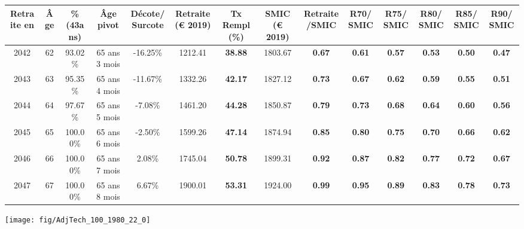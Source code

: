 \begin{adjustbox}{max width=\textwidth} 
\begin{tabular}[htb]{|c|c||c|c|c||c|c||c|c||c|c|c|c|c|} 
\hline 
 Retraite en &  Âge &  \%(43ans) &  Âge pivot &  Décote/Surcote &  Retraite (\euro{} 2019) &  Tx Rempl(\%) &  SMIC (\euro{} 2019) &  Retraite/SMIC &  R70/SMIC &  R75/SMIC &  R80/SMIC &  R85/SMIC &  R90/SMIC \\ 
\hline \hline 
 2042 &  62 &  93.02\% &  65 ans 3 mois &  -16.25\% &  1212.41 &  {\bf 38.88} &  1803.67 &  {\bf {\color{red} 0.67}} &  {\bf {\color{red} 0.61}} &  {\bf {\color{red} 0.57}} &  {\bf {\color{red} 0.53}} &  {\bf {\color{red} 0.50}} &  {\bf {\color{red} 0.47}} \\ 
\hline 
 2043 &  63 &  95.35\% &  65 ans 4 mois &  -11.67\% &  1332.26 &  {\bf 42.17} &  1827.12 &  {\bf {\color{red} 0.73}} &  {\bf {\color{red} 0.67}} &  {\bf {\color{red} 0.62}} &  {\bf {\color{red} 0.59}} &  {\bf {\color{red} 0.55}} &  {\bf {\color{red} 0.51}} \\ 
\hline 
 2044 &  64 &  97.67\% &  65 ans 5 mois &  -7.08\% &  1461.20 &  {\bf 44.28} &  1850.87 &  {\bf {\color{red} 0.79}} &  {\bf {\color{red} 0.73}} &  {\bf {\color{red} 0.68}} &  {\bf {\color{red} 0.64}} &  {\bf {\color{red} 0.60}} &  {\bf {\color{red} 0.56}} \\ 
\hline 
 2045 &  65 &  100.00\% &  65 ans 6 mois &  -2.50\% &  1599.26 &  {\bf 47.14} &  1874.94 &  {\bf {\color{red} 0.85}} &  {\bf {\color{red} 0.80}} &  {\bf {\color{red} 0.75}} &  {\bf {\color{red} 0.70}} &  {\bf {\color{red} 0.66}} &  {\bf {\color{red} 0.62}} \\ 
\hline 
 2046 &  66 &  100.00\% &  65 ans 7 mois &  2.08\% &  1745.04 &  {\bf 50.78} &  1899.31 &  {\bf {\color{red} 0.92}} &  {\bf {\color{red} 0.87}} &  {\bf {\color{red} 0.82}} &  {\bf {\color{red} 0.77}} &  {\bf {\color{red} 0.72}} &  {\bf {\color{red} 0.67}} \\ 
\hline 
 2047 &  67 &  100.00\% &  65 ans 8 mois &  6.67\% &  1900.01 &  {\bf 53.31} &  1924.00 &  {\bf {\color{red} 0.99}} &  {\bf {\color{red} 0.95}} &  {\bf {\color{red} 0.89}} &  {\bf {\color{red} 0.83}} &  {\bf {\color{red} 0.78}} &  {\bf {\color{red} 0.73}} \\ 
\hline 
\hline 
\end{tabular} 
\end{adjustbox} 
 
 \vspace{0.1cm} 

 {\hspace{-2.2cm}\texttt{[image: fig/AdjTech\_100\_1980\_22\_0]}} 

